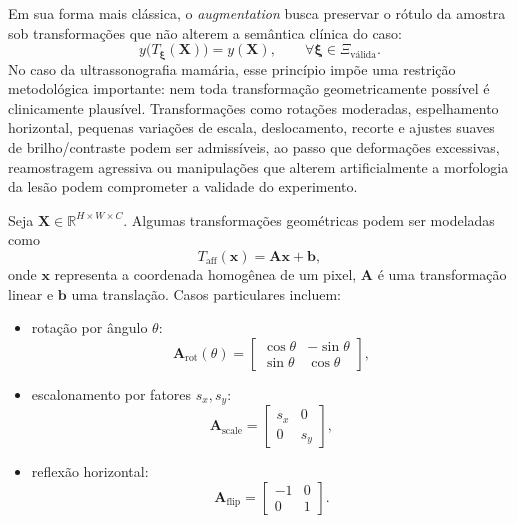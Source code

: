 \documentclass[tcc,capa]{texufpel}
\begin{document}
Em sua forma mais clássica, o \textit{augmentation} busca preservar o rótulo da amostra sob transformações que não alterem a semântica clínica do caso:
\begin{equation}
	y\big(T_{\boldsymbol{\xi}}(\mathbf{X})\big) = y(\mathbf{X}),
	\qquad \forall \boldsymbol{\xi} \in \Xi_{\text{válida}}.
\end{equation}
No caso da ultrassonografia mamária, esse princípio impõe uma restrição metodológica importante: nem toda transformação geometricamente possível é clinicamente plausível. Transformações como rotações moderadas, espelhamento horizontal, pequenas variações de escala, deslocamento, recorte e ajustes suaves de brilho/contraste podem ser admissíveis, ao passo que deformações excessivas, reamostragem agressiva ou manipulações que alterem artificialmente a morfologia da lesão podem comprometer a validade do experimento.

Seja \(\mathbf{X} \in \mathbb{R}^{H \times W \times C}\). Algumas transformações geométricas podem ser modeladas como
\begin{equation}
	T_{\text{aff}}(\mathbf{x}) = \mathbf{A}\mathbf{x} + \mathbf{b},
\end{equation}
onde \(\mathbf{x}\) representa a coordenada homogênea de um pixel, \(\mathbf{A}\) é uma transformação linear e \(\mathbf{b}\) uma translação. Casos particulares incluem:
\begin{itemize}
	\item rotação por ângulo \(\theta\):
	\begin{equation}
		\mathbf{A}_{\text{rot}}(\theta)
		=
		\begin{bmatrix}
			\cos\theta & -\sin\theta \\
			\sin\theta & \cos\theta
		\end{bmatrix},
	\end{equation}
	\item escalonamento por fatores \(s_x, s_y\):
	\begin{equation}
		\mathbf{A}_{\text{scale}}
		=
		\begin{bmatrix}
			s_x & 0\\
			0 & s_y
		\end{bmatrix},
	\end{equation}
	\item reflexão horizontal:
	\begin{equation}
		\mathbf{A}_{\text{flip}}
		=
		\begin{bmatrix}
			-1 & 0\\
			0 & 1
		\end{bmatrix}.
	\end{equation}
\end{itemize}
\end{document}
